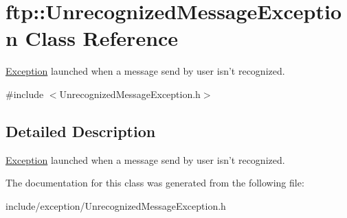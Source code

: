 \hypertarget{classftp_1_1_unrecognized_message_exception}{\section{ftp\-:\-:Unrecognized\-Message\-Exception Class Reference}
\label{classftp_1_1_unrecognized_message_exception}
}


\hyperlink{classftp_1_1_exception}{Exception} launched when a message send by user isn't recognized.  




{\ttfamily \#include $<$Unrecognized\-Message\-Exception.\-h$>$}



\subsection{Detailed Description}
\hyperlink{classftp_1_1_exception}{Exception} launched when a message send by user isn't recognized. 

The documentation for this class was generated from the following file\-:\begin{DoxyCompactItemize}
\item 
include/exception/Unrecognized\-Message\-Exception.\-h\end{DoxyCompactItemize}
